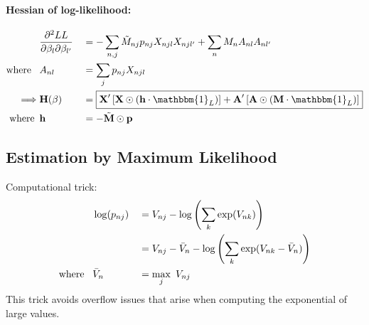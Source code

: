\documentclass[12pt]{article}
\begin{document}
\paragraph{Hessian of log-likelihood: \\}
\begin{equation}
\begin{aligned}
	& \frac{\partial^2 LL}{\partial \beta_l \partial \beta_{l'}} && = - \sum_{n,j} \tilde{M}_{nj} p_{nj} X_{njl} X_{njl'} + \sum_n M_n A_{nl} A_{nl'} \\
	\text{where } \hspace*{5pt} & A_{nl} && =\sum_j p_{nj} X_{njl} \\
 \implies	& \textbf{H}(\beta) && = \boxed{\textbf{X}' \left[ \textbf{X} \odot \left(\textbf{h} \cdot \mathbbm{1}_L \right) \right]  + \textbf{A}' \left[ \textbf{A}  \odot \left(\textbf{M} \cdot \mathbbm{1}_L \right) \right] }  \\ %
  \text{where} \hspace*{5pt} & \textbf{h} && = - \tilde{\textbf{M}} \odot \textbf{p}
\end{aligned}
\end{equation}


\subsection{Estimation by Maximum Likelihood}
Computational trick:
\begin{equation}
\begin{aligned}
	& \log(p_{nj}) && = V_{nj} - \log\left( \sum_k \exp(V_{nk}) \right) \\
	&  && = V_{nj} - \bar{V}_n - \log\left( \sum_k \exp(V_{nk} - \bar{V}_n) \right) \\
\text{where } \hspace*{5pt} & \bar{V}_n && = \underset{j}{\max} \hspace*{5pt} V_{nj}
\end{aligned}
\end{equation}
This trick avoids overflow issues that arise when computing the exponential of large values.
\end{document}
